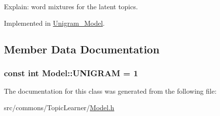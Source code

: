 Explain: word mixtures for the latent topics. 



Implemented in \hyperlink{class_unigram___model_a15ce4009b3434ea11a5045f8f20ce294}{Unigram\_\-Model}.



\subsection{Member Data Documentation}
\hypertarget{class_model_a84d38ec3409863e98cf31d9b311c5008}{
\subsubsection[{UNIGRAM}]{\setlength{\rightskip}{0pt plus 5cm}const int {\bf Model::UNIGRAM} = 1}}
\label{class_model_a84d38ec3409863e98cf31d9b311c5008}


The documentation for this class was generated from the following file:\begin{DoxyCompactItemize}
\item 
src/commons/TopicLearner/\hyperlink{_model_8h}{Model.h}\end{DoxyCompactItemize}
